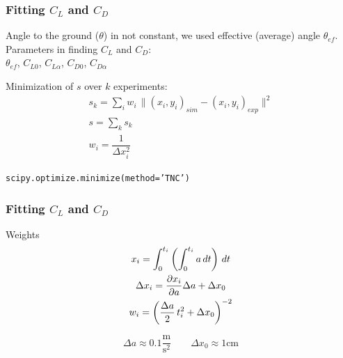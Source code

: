 \documentclass{beamer}
\begin{document}

\begin{frame}

\frametitle{Fitting $C_L$ and $C_D$}

Angle to the ground ($\theta$) in not constant, we used effective (average) angle $\theta_{ef}$.\\
Parameters in finding $C_L$ and $C_D$:\\
 \quad	$\theta_{ef}$, $C_{L0}$, $C_{L \alpha}$, $C_{D0}$, $C_{D \alpha}$

\begin{block}{Minimization of $s$ over $k$ experiments:}
\begin{gather}
s_k = \sum_{i} w_i \, \| (x_i, y_i)_{sim} - (x_i, y_i)_{exp} \|^2 \\
s = \sum_k s_k\\
w_i = \dfrac{1}{\Delta x_i^2}
\end{gather}

\begin{center}
\texttt{scipy.optimize.minimize(method='TNC')}
\end{center}
\end{block}

\end{frame}


\begin{frame}

\frametitle{Fitting $C_L$ and $C_D$}

\begin{block}{Weights}
\begin{gather}
x_i = \int_{0}^{t_i} \left( \int_{0}^{t_i} a \, dt \right) \,dt \\
\Delta x_i = \pdv{x_i}{a} \Delta a + \Delta x_0\\
w_i = \left( \dfrac{\Delta a}{2} \, t_i^2 + \Delta x_0 \right)^{-2}
\end{gather}
\end{block}

\[ \Delta a \approx 0.1 \mathrm{\dfrac{m}{s^2}} \qquad \Delta x_0 \approx 1 \mathrm{cm} \]

\end{frame}
\end{document}
